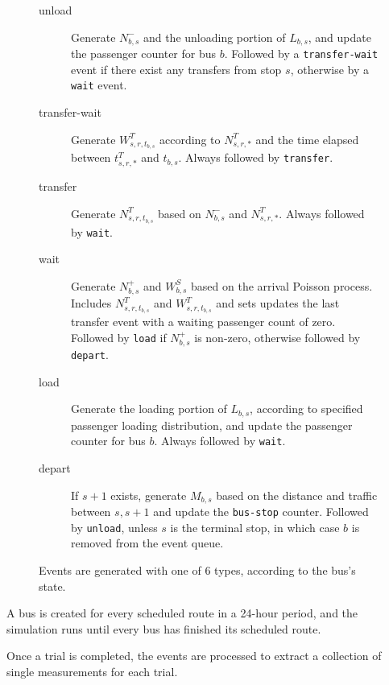 \documentclass[12pt]{article}
\theoremstyle{definition}
\begin{document}
\begin{figure}
    \caption{Events are generated with one of 6 types, according to the bus's
    state.}
\begin{description}
    \item[\ttfamily unload]
        Generate $N^-_{b,s}$ and the unloading portion of $L_{b,s}$, and
        update the passenger counter for bus $b$.  Followed by a
        \texttt{transfer-wait} event if there exist any transfers from stop
        $s$, otherwise by a \texttt{wait} event.
        
    \item[\ttfamily transfer-wait]
        Generate $W^T_{s,r,t_{b,s}}$ according to $N^T_{s,r,*}$ and the time
        elapsed between $t^T_{s,r,*}$ and $t_{b,s}$. Always followed by
        \texttt{transfer}.

    \item[\ttfamily transfer]
        Generate $N^T_{s,r,t_{b,s}}$ based on $N^-_{b,s}$ and
        $N^T_{s,r,*}$. Always followed by \texttt{wait}.

    \item[\ttfamily wait]
        Generate $N^+_{b,s}$ and $W^S_{b,s}$ based on the arrival Poisson
        process. Includes $N^T_{s,r,t_{b,s}}$ and $W^T_{s,r,t_{b,s}}$ and sets
        updates the last transfer event with a waiting passenger count of
        zero. Followed by \texttt{load} if $N^+_{b,s}$ is non-zero, otherwise
        followed by \texttt{depart}.

    \item[\ttfamily load]
        Generate the loading portion of $L_{b,s}$, according to specified
        passenger loading distribution, and update the passenger counter for
        bus $b$. Always followed by \texttt{wait}.

    \item[\ttfamily depart]
        If $s+1$ exists, generate $M_{b,s}$ based on the distance and traffic
        between $s, s+1$ and update the \texttt{bus-stop} counter. Followed by
        \texttt{unload}, unless $s$ is the terminal stop, in which case $b$ is
        removed from the event queue.
\end{description}
\label{fig:event-type}
\end{figure}

A bus is created for every scheduled route in a 24-hour period, and the
simulation runs until every bus has finished its scheduled route.

Once a trial is completed, the events are processed to extract a collection of
single measurements for each trial.
\end{document}
